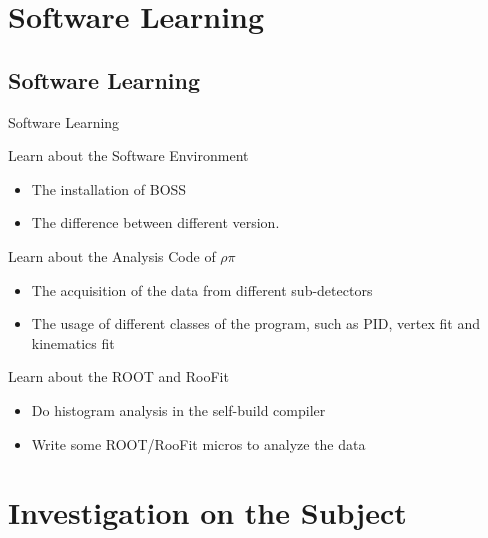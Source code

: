 \documentclass{beamer}
\begin{document}
\section{Software Learning}
\subsection{Software Learning}
\begin{frame}{Software Learning}
\begin{block}{Learn about the Software Environment}
\begin{itemize}
\item The installation of BOSS
\item The difference between different version.
\end{itemize}
\end{block}
\begin{block}{Learn about the Analysis Code of $\rho\pi$}
\begin{itemize}
\item The acquisition of the data from different sub-detectors
\item The usage of different classes of the program, such as PID, vertex fit and kinematics fit
\end{itemize}
\end{block}
\begin{block}{Learn about the ROOT and RooFit}
\begin{itemize}
\item Do histogram analysis in the self-build compiler
\item Write some ROOT/RooFit micros to analyze the data
\end{itemize}
\end{block}
\end{frame}

\section{Investigation on the Subject}
\end{document}

